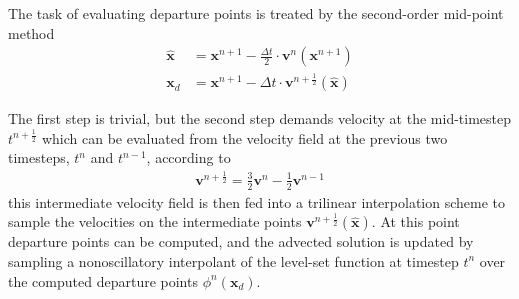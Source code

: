 \documentclass{elsarticle}
\begin{document}
The task of evaluating departure points is treated by the second-order mid-point method \cite{XIU2001658}
\begin{align*}
	\hat{\mathbf{x}} &= \mathbf{x}^{n+1} - \frac{\Delta t}{2} \cdot \mathbf{v}^n(\mathbf{x}^{n+1})\\
	\mathbf{x}_d &= \mathbf{x}^{n+1} - \Delta t \cdot \mathbf{v}^{n+\frac{1}{2}}(\hat{\mathbf{x}})
\end{align*}

The first step is trivial, but the second step demands velocity at the mid-timestep $t^{n + \frac{1}{2}}$ which can be evaluated from the velocity field at the previous two timesteps, $t^n$ and $t^{n-1}$, according to
\begin{align*}
	\mathbf{v}^{n+\frac{1}{2}} = \frac{3}{2}\mathbf{v}^n - \frac{1}{2} \mathbf{v}^{n-1}
\end{align*}
this intermediate velocity field is then fed into a trilinear interpolation scheme to sample the velocities on the intermediate points $\mathbf{v}^{n+\frac{1}{2}}(\hat{\mathbf{x}})$. At this point departure points can be computed, and the advected solution is updated by sampling a nonoscillatory interpolant of the level-set function at timestep $t^n$ over the computed departure points $\phi^n(\mathbf{x}_d)$.
\end{document}
